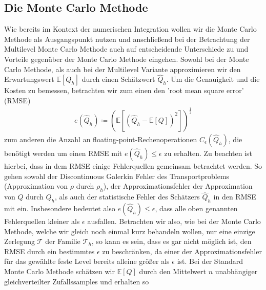 \subsection{Die Monte Carlo Methode}
Wie bereits im Kontext der numerischen Integration wollen wir die Monte Carlo Methode als Ausgangspunkt nutzen und anschließend bei der Betrachtung der Multilevel Monte Carlo Methode auch auf entscheidende Unterschiede zu und Vorteile gegenüber der Monte Carlo Methode eingehen.
Sowohl bei der Monte Carlo Methode, als auch bei der Multilevel Variante approximieren wir den Erwartungswert $ \mathbb{E}[Q_h] $ durch einen Schätzwert $ \widehat{Q}_h $. Um die Genauigkeit und die Kosten zu bemessen, betrachten wir zum einen den 'root mean square error' (RMSE) 
\begin{align}
	\label{RMSE}
	e( \widehat{Q}_h) \coloneqq \left(  \mathbb{E} \left[ (\widehat{Q}_h - \mathbb{E}[Q] )^2 \right] \right)^{\frac{1}{2}}
\end{align}
zum anderen die Anzahl an floating-point-Rechenoperationen $ C_{\epsilon}(\widehat{Q}_h) $, die benötigt werden um einen RMSE mit $ e( \widehat{Q}_h) \leq \epsilon $ zu erhalten.
Zu beachten ist hierbei, dass in dem RMSE einige Fehlerquellen gemeinsam betrachtet werden. So gehen sowohl der Discontinuous Galerkin Fehler des Transportproblems (Approximation von $ \rho $ durch $ \rho_h $), der Approximationsfehler der Approximation von $ Q $ durch $ Q_h $, als auch der statistische Fehler des Schätzers $\widehat{Q}_h$ in den RMSE mit ein. Insbesondere bedeutet also $ e( \widehat{Q}_h) \leq \epsilon $, dass alle oben genannten Fehlerquellen kleiner als $ \epsilon $ ausfallen. Betrachten wir also, wie bei der Monte Carlo Methode, welche wir gleich noch einmal kurz behandeln wollen, nur eine einzige Zerlegung $ \mathcal{T} $ der Familie $ \mathcal{T}_h $, so kann es sein, dass es gar nicht möglich ist, den RMSE durch ein bestimmtes $ \epsilon $ zu beschränken, da einer der Approximationsfehler für das gewählte feste Level bereits alleine größer als $ \epsilon $ ist. 
Bei der Standard Monte Carlo Methode schätzen wir $ \mathbb{E}[Q] $ durch den Mittelwert  $ n $ unabhängiger gleichverteilter Zufallssamples und erhalten so 
